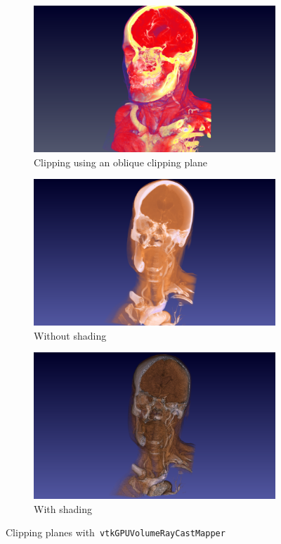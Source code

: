 \begin{figure}[htb]
  \centering
  \begin{subfigure}[b]{\columnwidth}
    \includegraphics[width=\textwidth]{HeadClippingOblique}
    \caption{Clipping using an oblique clipping plane}
    \label{fig:clipoblique}
  \end{subfigure}
  \begin{subfigure}[b]{.5\columnwidth}
    \includegraphics[width=\textwidth]{HeadClippingSlabNoShading}
    \caption{Without shading}
    \label{fig:clipnoshading}
  \end{subfigure}%
  \begin{subfigure}[b]{.5\columnwidth}
    \includegraphics[width=\textwidth]{HeadClippingSlabShading}
    \caption{With shading}
    \label{fig:clipshading}
  \end{subfigure}
  \caption{Clipping planes with~\texttt{vtkGPUVolumeRayCastMapper}}
  \label{fig:clipping}
\end{figure}

